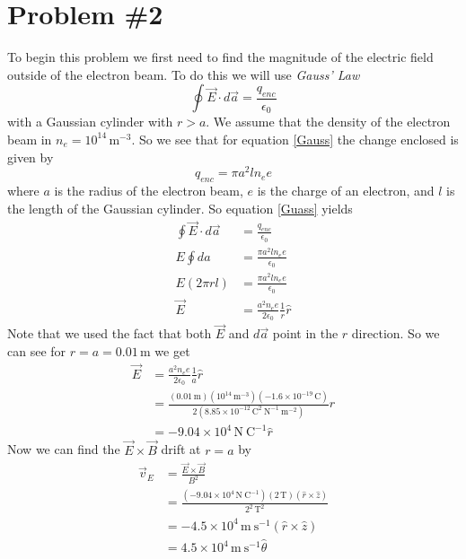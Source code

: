 \documentclass[11pt]{article}
\numberwithin{equation}{section}
\newcommand{\unit}[1]{\ensuremath{\, \mathrm{#1}}}
\begin{document}
\section{Problem \#2}
To begin this problem we first need to find the magnitude of the electric field outside of the electron beam. To do this we will use \emph{Gauss' Law} 
\begin{equation}
\oint\vec{E}\cdot d\vec{a} = \frac{q_{enc}}{\epsilon_0}
\label{Gauss}
\end{equation}
with a Gaussian cylinder with $r>a$. We assume that the density of the electron beam in $n_e = 10^{14}\unit{m^{-3}}$. So we see that for equation \ref{Gauss} the change enclosed is given by
$$q_{enc} = \pi a^2 l n_e e$$
where $a$ is the radius of the electron beam, $e$ is the charge of an electron, and $l$ is the length of the Gaussian cylinder. So equation \ref{Guass} yields
\begin{align*}
\oint\vec{E}\cdot d\vec{a} &= \frac{q_{enc}}{\epsilon_0}\\
E\oint da &= \frac{\pi a^2 l n_ee}{\epsilon_0}\\
E(2\pi r l)&= \frac{\pi a^2 l n_ee}{\epsilon_0}\\
\vec{E} &= \frac{a^2 n_ee}{2\epsilon_0}\frac{1}{r}\hat{r}
\end{align*}
Note that we used the fact that both $\vec{E}$ and $d\vec{a}$ point in the $\hat{r}$ direction. So we can see for $r=a=0.01\unit{m}$ we get
\begin{align*} 
\vec{E} &= \frac{a^2 n_ee}{2\epsilon_0}\frac{1}{a}\hat{r}\\
&= \frac{(0.01\unit{m})(10^{14}\unit{m^{-3}})(-1.6\times10^{-19}\unit{C})}{2(8.85\times10^{-12}\unit{C^2\ N^{-1}\ m^{-2}})}\hat{r}\\
&= -9.04\times10^{4}\unit{N\ C^{-1}}\hat{r}
\end{align*} 
Now we can find the $\vec{E}\times\vec{B}$ drift at $r=a$ by
\begin{align*}
\vec{v}_E &= \frac{\vec{E}\times\vec{B}}{B^2}\\
&= \frac{(-9.04\times10^4\unit{N\ C^{-1}})(2\unit{T})(\hat{r}\times\hat{z})}{2^2\unit{T^2}}\\
&= -4.5\times10^{4}\unit{m\ s^{-1}}(\hat{r}\times\hat{z})\\
&= 4.5\times10^{4}\unit{m\ s^{-1}}\hat{\theta}
\end{align*}
\end{document}
